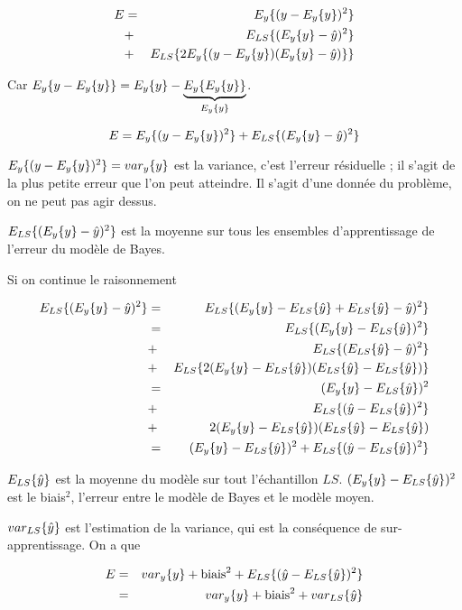 	\begin{eqnarray*}
  	E & = & E_y\{(y - E_y\{y\})^2\} \\
  	 & + & E_{LS}\{(E_y\{y\} - \hat{y})^2\} \\
  	 & + & E_{LS}\{2E_y\{(y - E_y\{y\})(E_y\{y\} - \hat{y})\}\}
	\end{eqnarray*}
	
	Car $E_y\{y - E_y\{y\}\} = E_y\{y\} - \underbrace{E_y\{E_y\{y\}\}}_{E_y\{y\}}$.
	
	$$E =E_y\{(y - E_y\{y\})^2\} + E_{LS}\{(E_y\{y\} - \hat{y})^2\}$$
	
	$E_y\{(y - E_y\{y\})^2\} = var_y\{y\}$ est la variance, c'est l'erreur résiduelle ; il s'agit de la plus petite erreur que l'on peut atteindre. Il s'agit d'une donnée du problème, on ne peut pas agir dessus.
	
	$E_{LS}\{(E_y\{y\} - \hat{y})^2\}$ est la moyenne sur tous les ensembles d'apprentissage de l'erreur du modèle de Bayes.
	
	
	Si on continue le raisonnement
	
	\begin{eqnarray*}
  	E_{LS}\{(E_y\{y\} - \hat{y})^2\} & = & E_{LS}\{(E_y\{y\} - E_{LS}\{\hat{y}\} + E_{LS}\{\hat{y}\} - \hat{y})^2\} \\
  	 & = & E_{LS}\{(E_y\{y\} - E_{LS}\{\hat{y}\})^2\} \\
  	 & + & E_{LS}\{(E_{LS}\{\hat{y}\} - \hat{y})^2\} \\
  	 & + & E_{LS}\{2(E_y\{y\} - E_{LS}\{\hat{y}\})(E_{LS}\{\hat{y}\} - E_{LS}\{\hat{y}\})\} \\
  	 & = & (E_y\{y\} - E_{LS}\{\hat{y}\})^2 \\
  	 & + & E_{LS}\{(\hat{y} - E_{LS}\{\hat{y}\})^2\} \\
  	 & + & 2(E_y\{y\} - E_{LS}\{\hat{y}\})(E_{LS}\{\hat{y}\} - E_{LS}\{\hat{y}\}) \\
  	 & = & (E_y\{y\} - E_{LS}\{\hat{y}\})^2 + E_{LS}\{(\hat{y} - E_{LS}\{\hat{y}\})^2\}
	\end{eqnarray*}
	

		
	$E_{LS}\{\hat{y}\}$ est la moyenne du modèle sur tout l'échantillon $LS$. $(E_y\{y\} - E_{LS}\{\hat{y}\})^2$ est le biais$^2$, l'erreur entre le modèle de Bayes et le modèle moyen.
		
	
	$var_{LS}\{\hat{y}\}$ est l'estimation de la variance, qui est la conséquence de sur-apprentissage. On a que
	
	\begin{eqnarray*}
	E & = & var_y\{y\} + \text{biais}^2 + E_{LS}\{(\hat{y} - E_{LS}\{\hat{y}\})^2\} \\
     & = & var_y\{y\} + \text{biais}^2 + var_{LS}\{\hat{y}\}
	\end{eqnarray*}
	

